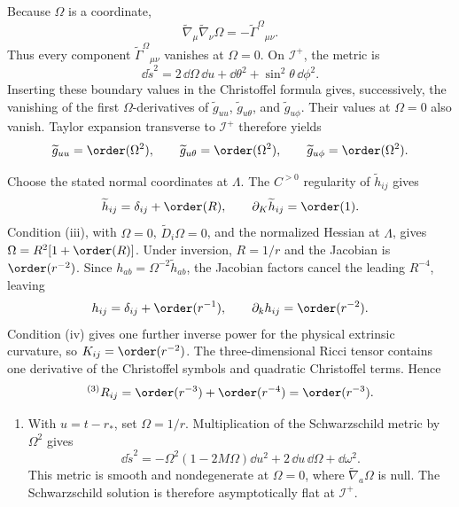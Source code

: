\ExerciseEditorialNote

\begin{enumerate}[leftmargin=2.8em,itemsep=1.2em]
Because \(\Omega\) is a coordinate,
\[
 \widetilde\nabla_\mu\widetilde\nabla_\nu\Omega
 =-\widetilde\Gamma^{\Omega}{}_{\mu\nu}.
\]
Thus every component \(\widetilde\Gamma^{\Omega}{}_{\mu\nu}\) vanishes at
\(\Omega=0\).  On \(\mathcal I^+\), the metric is
\[
 \dd\widetilde s^2=2\,\dd\Omega\,\dd u+
 \dd\theta^2+\sin^2\theta\,\dd\phi^2.
\]
Inserting these boundary values in the Christoffel formula gives, successively,
the vanishing of the first \(\Omega\)-derivatives of
\(\widetilde g_{uu}\), \(\widetilde g_{u\theta}\), and
\(\widetilde g_{u\phi}\).  Their values at \(\Omega=0\) also vanish.
Taylor expansion transverse to \(\mathcal I^+\) therefore yields
\[
 \widetilde g_{uu}=\order(\Omega^2),\qquad
 \widetilde g_{u\theta}=\order(\Omega^2),\qquad
 \widetilde g_{u\phi}=\order(\Omega^2).
\]

Choose the stated normal coordinates at \(\Lambda\).  The \(C^{>0}\)
regularity of \(\widetilde h_{ij}\) gives
\[
 \widetilde h_{ij}=\delta_{ij}+\order(R),\qquad
 \partial_K\widetilde h_{ij}=\order(1).
\]
Condition (iii), with \(\Omega=0\), \(\widetilde D_i\Omega=0\), and the
normalized Hessian at \(\Lambda\), gives
\(\Omega=R^2[1+\order(R)]\).  Under inversion,
\(R=1/r\) and the Jacobian is \(\order(r^{-2})\).  Since
\(h_{ab}=\Omega^{-2}\widetilde h_{ab}\), the Jacobian factors cancel the
leading \(R^{-4}\), leaving
\[
 h_{ij}=\delta_{ij}+\order(r^{-1}),\qquad
 \partial_k h_{ij}=\order(r^{-2}).
\]
Condition (iv) gives one further inverse power for the physical extrinsic
curvature, so \(K_{ij}=\order(r^{-2})\).  The three-dimensional Ricci tensor
contains one derivative of the Christoffel symbols and quadratic Christoffel
terms.  Hence
\[
 {}^{(3)}R_{ij}=\order(r^{-3})+\order(r^{-4})
 =\order(r^{-3}).
\]

\begin{enumerate}[label=\alph*),leftmargin=2em]
\item With \(u=t-r_*\), set \(\Omega=1/r\).  Multiplication of the
Schwarzschild metric by \(\Omega^2\) gives
\[
 \dd\widetilde s^2=-\Omega^2(1-2M\Omega)\dd u^2
 +2\,\dd u\,\dd\Omega+\dd\omega^2.
\]
This metric is smooth and nondegenerate at \(\Omega=0\), where
\(\widetilde\nabla_a\Omega\) is null.  The Schwarzschild solution is therefore
asymptotically flat at \(\mathcal I^+\).


\end{enumerate}
\end{enumerate}
